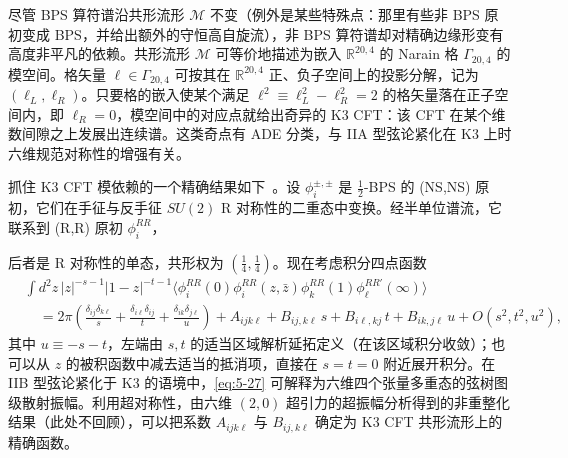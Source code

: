 
尽管 BPS 算符谱沿共形流形 $\mathcal{M}$ 不变（例外是某些特殊点：那里有些非 BPS 原初变成 BPS，并给出额外的守恒高自旋流），非 BPS 算符谱却对精确边缘形变有高度非平凡的依赖。共形流形 $\mathcal{M}$ 可等价地描述为嵌入 $\mathbb{R}^{20,4}$ 的 Narain 格 $\Gamma_{20,4}$ 的模空间。格矢量 $\ell\in\Gamma_{20,4}$ 可按其在 $\mathbb{R}^{20,4}$ 正、负子空间上的投影分解，记为 $(\ell_L,\ell_R)$。只要格的嵌入使某个满足 $\ell^2\equiv\ell_L^2-\ell_R^2=2$ 的格矢量落在正子空间内，即 $\ell_R=0$，模空间中的对应点就给出奇异的 K3 CFT：该 CFT 在某个维数间隙之上发展出连续谱。这类奇点有 ADE 分类，与 IIA 型弦论紧化在 K3 上时六维规范对称性的增强有关。

抓住 K3 CFT 模依赖的一个精确结果如下~\cite{r62,r63}。设 $\phi_i^{\pm,\pm}$ 是 $\frac12$-BPS 的 (NS,NS) 原初，它们在手征与反手征 $SU(2)$ R 对称性的二重态中变换。经半单位谱流，它联系到 (R,R) 原初 $\phi_i^{RR}$，


后者是 R 对称性的单态，共形权为 $(\frac14,\frac14)$。现在考虑积分四点函数
\begin{equation}
  \label{eq:5-27}
  \begin{aligned}
    &\int d^2z\,|z|^{-s-1}|1-z|^{-t-1}
    \bigl\langle \phi_i^{RR}(0)\phi_i^{RR}(z,\bar z)
      \phi_k^{RR}(1)\phi_\ell^{RR'}(\infty)\bigr\rangle\\
    &\quad = 2\pi\left(
      \frac{\delta_{ij}\delta_{k\ell}}{s}
      + \frac{\delta_{i\ell}\delta_{ij}}{t}
      + \frac{\delta_{ik}\delta_{j\ell}}{u}\right)
      + A_{ijk\ell} + B_{ij,k\ell}\,s
      + B_{i\ell,kj}\,t + B_{ik,j\ell}\,u
      + O(s^2,t^2,u^2),
  \end{aligned}
\end{equation}
其中 $u\equiv -s-t$，左端由 $s,t$ 的适当区域解析延拓定义（在该区域积分收敛）；也可以从 $z$ 的被积函数中减去适当的抵消项，直接在 $s=t=0$ 附近展开积分。在 IIB 型弦论紧化于 K3 的语境中，\eqref{eq:5-27} 可解释为六维四个张量多重态的弦树图级散射振幅。利用超对称性，由六维 $(2,0)$ 超引力的超振幅分析得到的非重整化结果（此处不回顾），可以把系数 $A_{ijk\ell}$ 与 $B_{ij,k\ell}$ 确定为 K3 CFT 共形流形上的精确函数。



